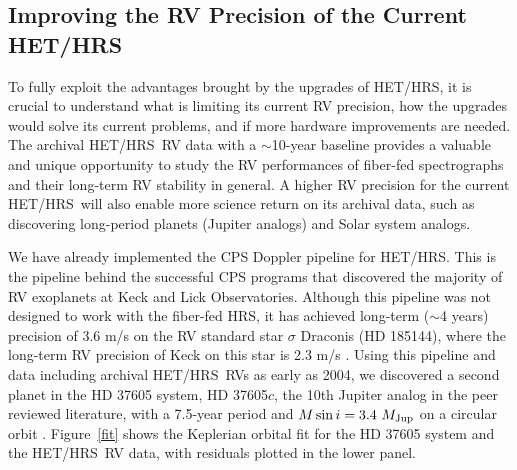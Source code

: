 \documentclass[12pt]{article}
\def\msini{M\sin{i}}
\def\mjup{M_{\rm Jup}}
\def\hrs{HET/HRS}
\begin{document}
\vspace{-3pt}
\subsection{Improving the RV Precision of the Current HET/HRS}

To fully exploit the advantages brought by the upgrades of \hrs, it is
crucial to understand what is limiting its current RV precision, how
the upgrades would solve its current problems, and if more hardware
improvements are needed. The archival \hrs\ RV data with a
$\sim$10-year baseline provides a valuable and unique opportunity to
study the RV performances of fiber-fed spectrographs and their
long-term RV stability in general. A higher RV precision for the
current \hrs\ will also enable more science return on its archival
data, such as discovering long-period planets (Jupiter analogs) and
Solar system analogs.

We have already implemented the CPS Doppler pipeline for \hrs. This is
the pipeline behind the successful CPS programs that discovered the
majority of RV exoplanets at Keck and Lick Observatories. Although this pipeline
was not designed to work with the fiber-fed HRS, it has achieved
long-term ($\sim$4 years) precision of 3.6 m/s on the RV standard star
$\sigma$ Draconis (HD 185144), where the long-term RV precision of
Keck on this star is 2.3 m/s \citep{wang2011}. Using this pipeline and data including
archival \hrs\ RVs as early as 2004, we discovered a second planet in
the HD 37605 system, HD 37605$c$, the 10th Jupiter analog in the peer
reviewed literature, with a 7.5-year period and $\msini = 3.4\ \mjup$
on a circular orbit \citep{wang2012}. Figure~\ref{fit} shows the
Keplerian orbital fit for the HD 37605 system and the \hrs\ RV data,
with residuals plotted in the lower panel.
\end{document}
